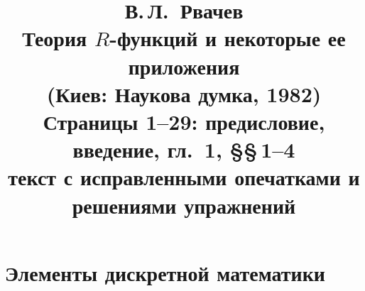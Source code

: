 \documentclass[11pt,a4paper,openany]{book}
\title{В.\,Л.~Рвачев\\[4pt]
\Large Теория $R$-функций и некоторые ее приложения\\[2pt]
\large (Киев: Наукова думка, 1982)\\[14pt]
\normalsize Страницы 1--29: предисловие, введение, гл.~1, \S\S\,1--4\\
текст с исправленными опечатками и решениями упражнений}
\author{}
\date{}
\begin{document}
\maketitle
\thispagestyle{empty}

\tableofcontents




\chapter{Элементы дискретной математики}





\appendix

\end{document}

